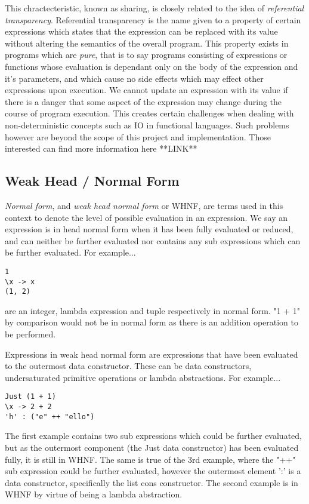 \documentclass[11pt]{article}
\begin{document}
This chractecteristic, known as sharing, is closely related to the idea
of \emph{referential transparency}. Referential transparency is the name
given to a property of certain expressions which states that the expression
can be replaced with its value without altering the semantics of the overall
program. This property exists in programs which are \emph{pure}, that is to
say programs consisting of expressions or functions whose evaluation is 
dependant only on the body of the expression and it's parameters, and which
cause no side effects which may effect other expressions upon execution. 
We cannot update an expression with its value if there is a danger that
some aspect of the expression may change during the course of program 
execution. This creates certain challenges when dealing with non-deterministic
concepts such as IO in functional languages. Such problems however are 
beyond the scope of this project and implementation. Those interested can
find more information here **LINK**

\subsection{Weak Head / Normal Form}
\emph{Normal form}, and \emph{weak head normal form} or WHNF, are terms used
in this context to denote the level of possible evaluation in an expression.
We say an expression is in head normal form when it has been fully evaluated
or reduced, and can neither be further evaluated nor contains any sub
expressions which can be further evaluated. For example...
\begin{verbatim}
1
\x -> x
(1, 2)
\end{verbatim}
are an integer, lambda expression and tuple respectively in normal form. "1 + 1"
by comparison would not be in normal form as there is an addition operation to
be performed.

Expressions in weak head normal form are expressions that have been evaluated
to the outermost data constructor. These can be data constructors, undersaturated
primitive operations or lambda abstractions. For example...
\begin{verbatim}
Just (1 + 1)
\x -> 2 + 2
'h' : ("e" ++ "ello")
\end{verbatim}
The first example contains two sub expressions which could be further evaluated,
but as the outermost component (the Just data constructor) has been evaluated 
fully, it is still in WHNF. The same is true of the 3rd example, where the "++"
sub expression could be further evaluated, however the outermost element
':' is a data constructor, specifically the list cons constructor. The second
example is in WHNF by virtue of being a lambda abstraction.
\end{document}
